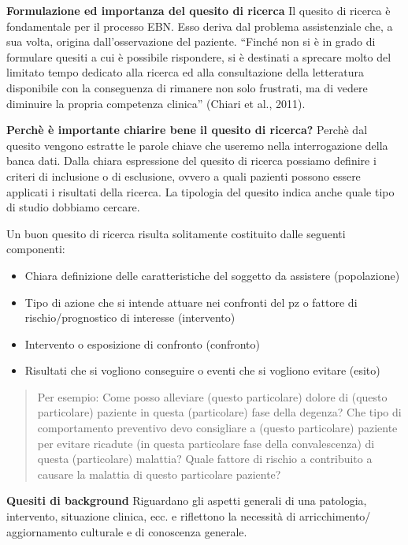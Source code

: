 \documentclass[]{book}
\begin{document}
\textbf{Formulazione ed importanza del quesito di ricerca}
Il quesito di ricerca è fondamentale per il processo EBN. Esso deriva dal problema assistenziale che, a sua volta, origina dall'osservazione del paziente. ``Finché non si è in grado di formulare quesiti a cui è possibile rispondere, si è destinati a sprecare molto del limitato tempo dedicato alla ricerca ed alla consultazione della letteratura disponibile con la conseguenza di rimanere non solo frustrati, ma di vedere diminuire la propria competenza clinica'' (Chiari et al., 2011).

\textbf{Perchè è importante chiarire bene il quesito di ricerca?} Perchè dal quesito vengono estratte le parole chiave che useremo nella interrogazione della banca dati. Dalla chiara espressione del quesito di ricerca possiamo definire i criteri di inclusione o di esclusione, ovvero a quali pazienti possono essere applicati i risultati della ricerca. La tipologia del quesito indica anche quale tipo di studio dobbiamo cercare.

Un buon quesito di ricerca risulta solitamente costituito dalle seguenti componenti:

\begin{itemize}
\item
  Chiara definizione delle caratteristiche del soggetto da assistere (popolazione)
\item
  Tipo di azione che si intende attuare nei confronti del pz o fattore di rischio/prognostico di interesse (intervento)
\item
  Intervento o esposizione di confronto (confronto)
\item
  Risultati che si vogliono conseguire o eventi che si vogliono evitare (esito)
\end{itemize}

\begin{quote}
Per esempio: Come posso alleviare (questo particolare) dolore di (questo particolare) paziente in questa (particolare) fase della degenza?
Che tipo di comportamento preventivo devo consigliare a (questo particolare) paziente per evitare ricadute (in questa particolare fase della convalescenza) di questa (particolare) malattia?
Quale fattore di rischio a contribuito a causare la malattia di questo particolare paziente?
\end{quote}

\textbf{Quesiti di background} Riguardano gli aspetti generali di una patologia, intervento, situazione clinica, ecc. e riflettono la necessità di arricchimento/ aggiornamento culturale e di conoscenza generale.
\end{document}

